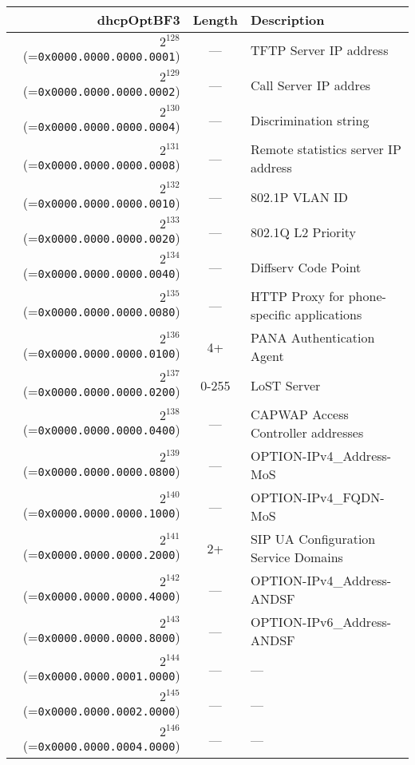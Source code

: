 \documentclass[documentation]{subfiles}
\begin{document}
\begin{small}
    \begin{longtable}{rcl}
        \toprule
        {\bf dhcpOptBF3} & {\bf Length} & {\bf Description}\\
        \midrule\endhead%
        $2^{128}$ (={\tt 0x0000.0000.0000.0001}) & ---   & TFTP Server IP address \\
        $2^{129}$ (={\tt 0x0000.0000.0000.0002}) & ---   & Call Server IP addres \\
        $2^{130}$ (={\tt 0x0000.0000.0000.0004}) & ---   & Discrimination string \\
        $2^{131}$ (={\tt 0x0000.0000.0000.0008}) & ---   & Remote statistics server IP address \\
        $2^{132}$ (={\tt 0x0000.0000.0000.0010}) & ---   & 802.1P VLAN ID \\
        $2^{133}$ (={\tt 0x0000.0000.0000.0020}) & ---   & 802.1Q L2 Priority \\
        $2^{134}$ (={\tt 0x0000.0000.0000.0040}) & ---   & Diffserv Code Point \\
        $2^{135}$ (={\tt 0x0000.0000.0000.0080}) & ---   & HTTP Proxy for phone-specific applications \\
        $2^{136}$ (={\tt 0x0000.0000.0000.0100}) & 4+    & PANA Authentication Agent \\
        $2^{137}$ (={\tt 0x0000.0000.0000.0200}) & 0-255 & LoST Server \\
        $2^{138}$ (={\tt 0x0000.0000.0000.0400}) & ---   & CAPWAP Access Controller addresses \\
        $2^{139}$ (={\tt 0x0000.0000.0000.0800}) & ---   & OPTION-IPv4\_Address-MoS \\
        $2^{140}$ (={\tt 0x0000.0000.0000.1000}) & ---   & OPTION-IPv4\_FQDN-MoS \\
        $2^{141}$ (={\tt 0x0000.0000.0000.2000}) & 2+    & SIP UA Configuration Service Domains \\
        $2^{142}$ (={\tt 0x0000.0000.0000.4000}) & ---   & OPTION-IPv4\_Address-ANDSF \\
        $2^{143}$ (={\tt 0x0000.0000.0000.8000}) & ---   & OPTION-IPv6\_Address-ANDSF \\
        $2^{144}$ (={\tt 0x0000.0000.0001.0000}) & ---   & --- \\
        $2^{145}$ (={\tt 0x0000.0000.0002.0000}) & ---   & --- \\
        $2^{146}$ (={\tt 0x0000.0000.0004.0000}) & ---   & --- \\

\end{longtable}
\end{small}
\end{document}
